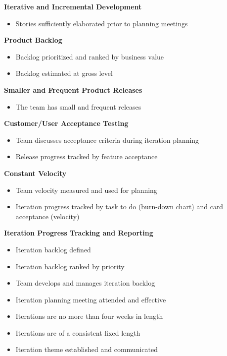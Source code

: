 \label{table:opp_leffingwell_practices}


\textbf{Iterative and Incremental Development}
\begin{itemize}
	\item Stories sufficiently elaborated prior to planning meetings
\end{itemize}

\textbf{Product Backlog}
\begin{itemize}
	\item Backlog prioritized and ranked by business value
	\item Backlog estimated at gross level
\end{itemize}

\textbf{Smaller and Frequent Product Releases}
\begin{itemize}
	\item The team has small and frequent releases
\end{itemize}

\textbf{Customer/User Acceptance Testing}
\begin{itemize}
	\item Team discusses acceptance criteria during iteration planning
	\item Release progress tracked by feature acceptance
\end{itemize}

\textbf{Constant Velocity}
\begin{itemize}
	\item Team velocity measured and used for planning
	\item Iteration progress tracked by task to do (burn-down chart) and card acceptance (velocity)
\end{itemize}

\textbf{Iteration Progress Tracking and Reporting}
\begin{itemize}
	\item Iteration backlog defined
	\item Iteration backlog ranked by priority
	\item Team develops and manages iteration backlog
	\item Iteration planning meeting attended and effective
	\item Iterations are no more than four weeks in length
	\item Iterations are of a consistent fixed length
	\item Iteration theme established and communicated 
\end{itemize}

